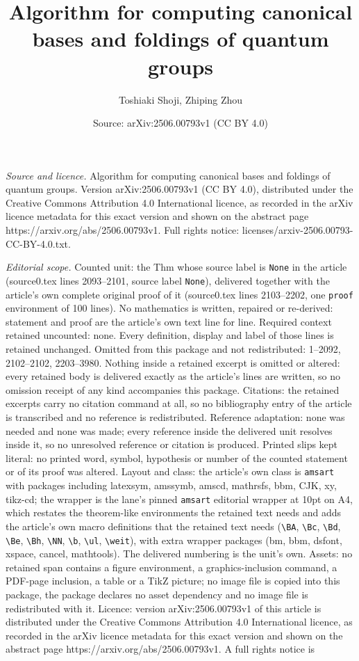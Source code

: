 \documentclass[10pt,a4paper]{amsart}
\title[Algorithm for computing canonical bases and foldings of quan]{Algorithm for computing canonical bases and foldings of quantum groups}
\author{Toshiaki Shoji, Zhiping Zhou}
\date{Source: arXiv:2506.00793v1 (CC BY 4.0)}
\begin{document}
\maketitle

\noindent\emph{Source and licence.} Algorithm for computing canonical bases and foldings of quantum groups. Version arXiv:2506.00793v1 (CC BY 4.0), distributed under the Creative Commons Attribution 4.0 International licence, as recorded in the arXiv licence metadata for this exact version and shown on the abstract page https://arxiv.org/abs/2506.00793v1. Full rights notice: licenses/arxiv-2506.00793-CC-BY-4.0.txt.\par\smallskip

\noindent\textit{Editorial scope.} Counted unit: the Thm whose source label is \texttt{None} in the article (source0.tex lines 2093--2101, source label \texttt{None}), delivered together with the article's own complete original proof of it (source0.tex lines 2103--2202, one \texttt{proof} environment of 100 lines). No mathematics is written, repaired or re-derived: statement and proof are the article's own text line for line. Required context retained uncounted: none. Every definition, display and label of those lines is retained unchanged. Omitted from this package and not redistributed: 1--2092, 2102--2102, 2203--3980. Nothing inside a retained excerpt is omitted or altered: every retained body is delivered exactly as the article's lines are written, so no omission receipt of any kind accompanies this package. Citations: the retained excerpts carry no citation command at all, so no bibliography entry of the article is transcribed and no reference is redistributed. Reference adaptation: none was needed and none was made; every reference inside the delivered unit resolves inside it, so no unresolved reference or citation is produced. Printed slips kept literal: no printed word, symbol, hypothesis or number of the counted statement or of its proof was altered. Layout and class: the article's own class is \texttt{amsart} with packages including latexsym, amssymb, amscd, mathrsfs, bbm, CJK, xy, tikz-cd; the wrapper is the lane's pinned \texttt{amsart} editorial wrapper at 10pt on A4, which restates the theorem-like environments the retained text needs and adds the article's own macro definitions that the retained text needs (\texttt{\textbackslash BA}, \texttt{\textbackslash Bc}, \texttt{\textbackslash Bd}, \texttt{\textbackslash Be}, \texttt{\textbackslash Bh}, \texttt{\textbackslash NN}, \texttt{\textbackslash b}, \texttt{\textbackslash ul}, \texttt{\textbackslash weit}), with extra wrapper packages (bm, bbm, dsfont, xspace, cancel, mathtools). The delivered numbering is the unit's own. Assets: no retained span contains a figure environment, a graphics-inclusion command, a PDF-page inclusion, a table or a TikZ picture; no image file is copied into this package, the package declares no asset dependency and no image file is redistributed with it. Licence: version arXiv:2506.00793v1 of this article is distributed under the Creative Commons Attribution 4.0 International licence, as recorded in the arXiv licence metadata for this exact version and shown on the abstract page https://arxiv.org/abs/2506.00793v1. A full rights notice is 
\end{document}

